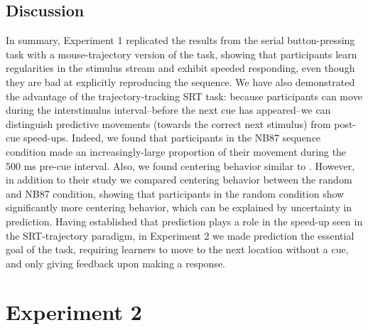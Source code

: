 \documentclass[man,floatsintext]{apa6}
\begin{document}

\subsection{Discussion}

In summary, Experiment 1 replicated the results from the  serial button-pressing task with a mouse-trajectory version of the task, showing that participants learn regularities in the stimulus stream and exhibit speeded responding, even though they are bad at explicitly reproducing the sequence. We have also demonstrated the advantage of the trajectory-tracking SRT task: because participants can move during the interstimulus interval--before the next cue has appeared--we can distinguish predictive movements (towards the correct next stimulus) from post-cue speed-ups. Indeed, we found that participants in the NB87 sequence condition made an increasingly-large proportion of their movement during the 500 ms pre-cue interval. Also, we found centering behavior similar to . However, in addition to their study we compared centering behavior between the random and NB87 condition, showing that participants in the random condition show significantly more centering behavior, which can be explained by uncertainty in prediction. Having established that prediction plays a role in the speed-up seen in the SRT-trajectory paradigm, in Experiment 2 we made prediction the essential goal of the task, requiring learners to move to the next location without a cue, and only giving feedback upon making a response.

\section{Experiment 2}
\end{document}
